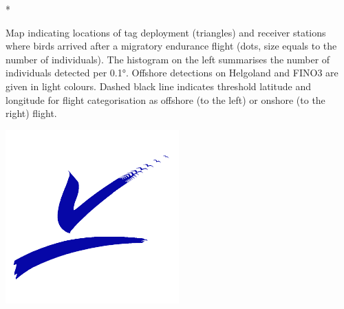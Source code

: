 \documentclass[
]{article}
\begin{document}
{*}

Map indicating locations of tag deployment (triangles) and receiver
stations where birds arrived after a migratory endurance flight (dots,
size equals to the number of individuals). The histogram on the left
summarises the number of individuals detected per 0.1°. Offshore
detections on Helgoland and FINO3 are given in light colours. Dashed
black line indicates threshold latitude and longitude for flight
categorisation as offshore (to the left) or onshore (to the right)
flight.

\includegraphics[width=0.5\textwidth,height=\textheight]{figures/IfV.png}
\end{document}
